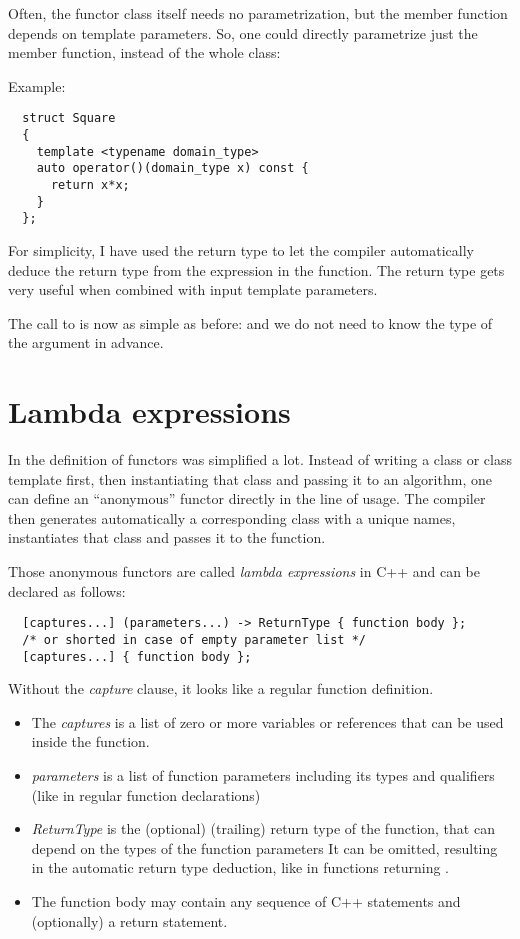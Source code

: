 Often, the functor class itself needs no parametrization, but the member function  depends on template parameters. So,
one could directly parametrize just the member function, instead of the whole class:

Example:
\begin{verbatim}
  struct Square
  {
    template <typename domain_type>
    auto operator()(domain_type x) const {
      return x*x;
    }
  };
\end{verbatim}
%
For simplicity, I have used the return type  to let the compiler automatically deduce the return type from the expression in the
function. The  return type gets very useful when combined with input template parameters.

The call to  is now as simple as before:
and we do not need to know the type of the argument in advance.


\section{Lambda expressions}
In \marginpar{[\cxx{11}]} the definition of functors was simplified a lot. Instead of writing a class or class template first, then instantiating that
class and passing it to an algorithm, one can define an ``anonymous'' functor directly in the line of usage. The compiler then generates automatically
a corresponding class with a unique names, instantiates that class and passes it to the function.

Those anonymous functors are called \emph{lambda expressions} in C++ and can be declared as follows:
%
\begin{verbatim}
  [captures...] (parameters...) -> ReturnType { function body };
  /* or shorted in case of empty parameter list */
  [captures...] { function body };
\end{verbatim}
%
Without the \emph{capture} clause, it looks like a regular function definition.
\begin{itemize}
  \item The \emph{captures} is a list of zero or more variables or references that can be used inside the function.
  \item \emph{parameters} is a list of function parameters including its types and qualifiers (like in regular function declarations)
  \item \emph{ReturnType} is the (optional) (trailing) return type of the function, that can depend on the types of the function parameters
        It can be omitted, resulting in the automatic return type deduction, like in functions returning .
  \item The function body may contain any sequence of C++ statements and (optionally) a return statement.
\end{itemize}

